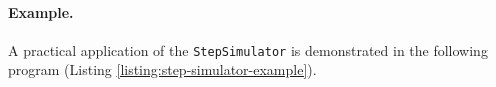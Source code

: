 \paragraph{Example.}
A practical application of the \texttt{StepSimulator} is demonstrated in the
following program (Listing \ref{listing:step-simulator-example}).


